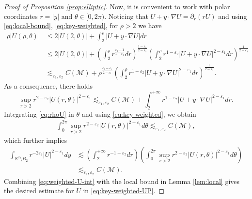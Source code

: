 \documentclass[12pt,reqno]{amsart}
\theoremstyle{plain}
\theoremstyle{definition}
\newcommand{\R}{\mathbb{R}}
\newcommand{\M}{\mathcal{M}}
\renewcommand{\:}{\colon}
\numberwithin{equation}{section}
\numberwithin{figure}{section}
\begin{document}
\begin{proof}[Proof of Proposition \ref{prop:elliptic}]
    
    Now, it is convenient to work with polar coordinates $r = |y|$ and $\theta \in [0, 2\pi)$. Noticing that $U+y\cdot \nabla U = \partial_r (r U)$ and using \eqref{eq:local-bound}, \eqref{eq:key-weighted}, for $\rho>2$ we have
    \begin{align} 
        \rho |U(\rho, \theta)| &\le 2 |U(2, \theta)|  +  \int_{2}^{\rho} |U + y \cdot \nabla U| dr \nonumber \\
        &\le 2 |U(2, \theta)| + \left( \int_{2}^{\rho} r^{\frac{\varepsilon_2-1}{1-\varepsilon_1}} dr \right)^{\frac{1-\varepsilon_1}{2-\varepsilon_1}} \left(\int_{2}^{\rho}  r^{1-\varepsilon_2} |U + y \cdot \nabla U|^{2-\varepsilon_1} dr\right)^{\frac{1}{2-\varepsilon_1}}  \nonumber \\
        &\lesssim_{\varepsilon_1, \varepsilon_2} C(\M) + \rho^{\frac{\varepsilon_2-\varepsilon_1}{2-\varepsilon_1}} \left(\int_{2}^{\rho}  r^{1-\varepsilon_2} |U + y \cdot \nabla U|^{2-\varepsilon_1} dr\right)^{\frac{1}{2-\varepsilon_1}}. \nonumber
    \end{align}
    As a consequence, there holds
    \begin{equation} \label{eq:rhoU}
    	\sup_{r >2} r^{2-\varepsilon_2} |U(r, \theta)|^{2-\varepsilon_1} \lesssim_{\varepsilon_1, \varepsilon_2} C(\M) + \int_{2}^{+\infty}  r^{1-\varepsilon_2} |U + y \cdot \nabla U|^{2-\varepsilon_1} dr.
    \end{equation}
    Integrating \eqref{eq:rhoU} in $\theta$ and using \eqref{eq:key-weighted}, we obtain 
    \begin{align} 
    	\int_0^{2\pi}  \sup_{r>2} r^{2-\varepsilon_2}  |U(r, \theta)|^{2-\varepsilon_1} d\theta \lesssim_{\varepsilon_1, \varepsilon_2} C(\M),
    \end{align}
    which further implies
\begin{align} \label{eq:weighted-U-int}
	\int_{\R^2\setminus B_{2}} r^{-2\varepsilon_2} |U|^{2-\varepsilon_1} dy &\lesssim  \left(\int_{2}^{+\infty} r^{-1-\varepsilon_2} dr \right) \left(  \int_0^{2\pi}  \sup_{r>2} r^{2-\varepsilon_2}  |U(r, \theta)|^{2-\varepsilon_1} d\theta \right) \nonumber \\
	&\lesssim_{\varepsilon_1, \varepsilon_2} C(\M). 
\end{align} 
Combining \eqref{eq:weighted-U-int} with the local bound in Lemma \ref{lem:local} gives the desired estimate for $U$ in \eqref{eq:key-weighted-UP}.




\end{proof}
\end{document}
